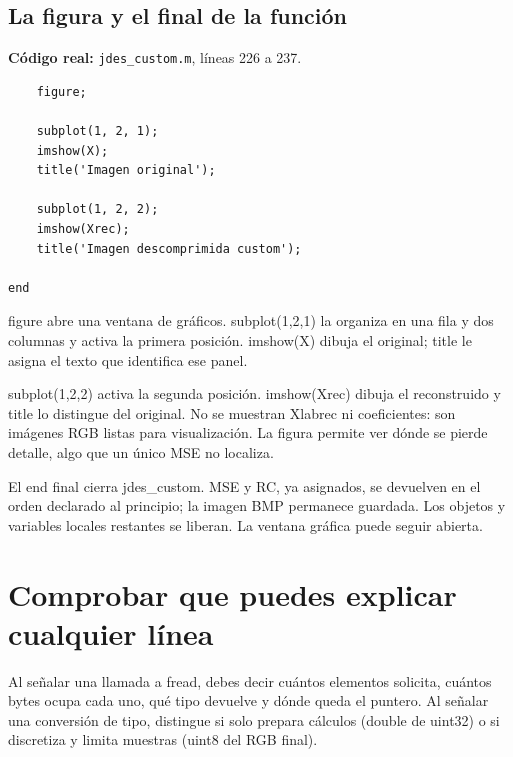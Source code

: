 \documentclass[11pt,a4paper,oneside]{report}
\begin{document}
\par\medskip\noindent\begin{minipage}{\linewidth}

\subsection{La figura y el final de la función}

\textbf{Código real:} \texttt{jdes\_custom.m}, líneas 226 a 237.

\begin{lstlisting}[firstnumber=226]
    % PASO 15: mostrar la imagen original y la reconstruida.
    figure;

    subplot(1, 2, 1);
    imshow(X);
    title('Imagen original');

    subplot(1, 2, 2);
    imshow(Xrec);
    title('Imagen descomprimida custom');
    
end
\end{lstlisting}

\end{minipage}\par


figure abre una ventana de gráficos. subplot(1,2,1) la organiza en una fila
y dos columnas y activa la primera posición. imshow(X) dibuja el original;
title le asigna el texto que identifica ese panel.

subplot(1,2,2) activa la segunda posición. imshow(Xrec) dibuja el reconstruido
y title lo distingue del original. No se muestran Xlabrec ni coeficientes:
son imágenes RGB listas para visualización. La figura permite ver dónde
se pierde detalle, algo que un único MSE no localiza.

El end final cierra jdes\_custom. MSE y RC, ya asignados, se devuelven en el
orden declarado al principio; la imagen BMP permanece guardada. Los objetos
y variables locales restantes se liberan. La ventana gráfica puede seguir abierta.


\section{Comprobar que puedes explicar cualquier línea}

Al señalar una llamada a fread, debes decir cuántos elementos solicita,
cuántos bytes ocupa cada uno, qué tipo devuelve y dónde queda el puntero.
Al señalar una conversión de tipo, distingue si solo prepara cálculos
(double de uint32) o si discretiza y limita muestras (uint8 del RGB final).
\end{document}
